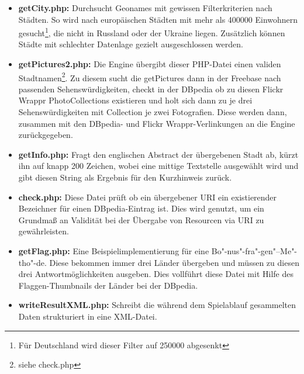 \documentclass[a4paper, 11pt]{article}
\begin{document}
\begin{itemize}
\label{sec:getCity}
\item \textbf{getCity.php:} Durchsucht Geonames mit gewissen Filterkriterien nach Städten. So wird nach europäischen Städten mit mehr als 400000 Einwohnern gesucht\footnote{Für Deutschland wird dieser Filter auf 250000 abgesenkt}, die nicht in Russland oder der Ukraine liegen. Zusätzlich können Städte mit schlechter Datenlage gezielt ausgeschlossen werden.
\item \textbf{getPictures2.php:} Die Engine übergibt dieser PHP-Datei einen validen Stadtnamen\footnote{siehe check.php }. Zu diesem sucht die getPictures dann in der Freebase nach passenden Sehenswürdigkeiten, checkt in der DBpedia ob zu diesen Flickr Wrappr PhotoCollections existieren und holt sich dann zu je drei Sehenswürdigkeiten mit Collection je zwei Fotografien. Diese werden dann, zusammen mit den DBpedia- und Flickr Wrappr-Verlinkungen an die Engine zurückgegeben.
\item \textbf{getInfo.php:} Fragt den englischen Abstract der übergebenen Stadt ab, kürzt ihn auf knapp 200 Zeichen, wobei eine mittige Textstelle ausgewählt wird und gibt diesen String als Ergebnis für den Kurzhinweis zurück.
\label{sec:check}
\item \textbf{check.php:} Diese Datei prüft ob ein übergebener URI ein existierender Bezeichner für einen DBpedia-Eintrag ist. Dies wird genutzt, um ein Grundmaß an Validität bei der Übergabe von Resourcen via URI zu gewährleisten.
\item \textbf{getFlag.php:} Eine Beispielimplementierung für eine Bo"-nus"-fra"-gen"--Me"-tho"-de. Diese bekommen immer drei Länder übergeben und müssen zu diesen drei Antwortmöglichkeiten ausgeben. Dies vollführt diese Datei mit Hilfe des Flaggen-Thumbnails der Länder bei der DBpedia.
\item \textbf{writeResultXML.php:} Schreibt die während dem Spielablauf gesammelten Daten strukturiert in eine XML-Datei.
\end{itemize}
\end{document}
